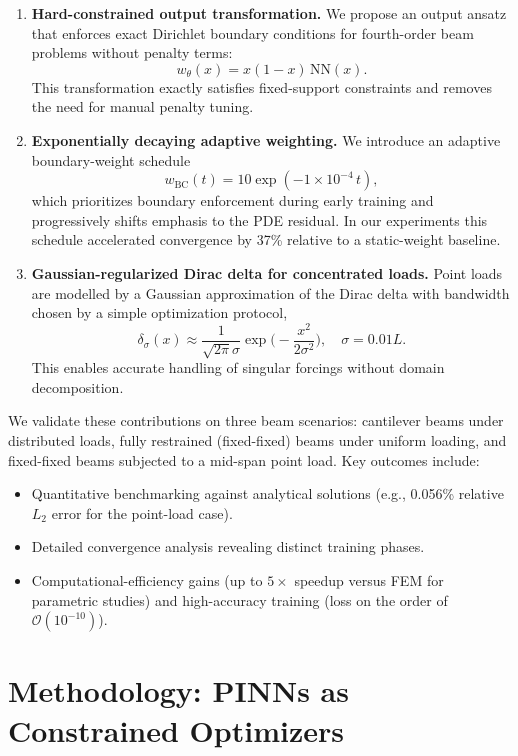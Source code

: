 \documentclass[twocolumn]{svjour3}
\begin{document}
\begin{enumerate}
\item \textbf{Hard-constrained output transformation.} 
  We propose an output ansatz that enforces exact Dirichlet boundary conditions for fourth-order beam problems without penalty terms:
  \[
    w_{\theta}(x) = x(1-x)\,\mathrm{NN}(x).
  \]
  This transformation exactly satisfies fixed-support constraints and removes the need for manual penalty tuning.
  
  \item \textbf{Exponentially decaying adaptive weighting.} 
  We introduce an adaptive boundary-weight schedule
  \[
    w_{\mathrm{BC}}(t)=10\exp(-1\times10^{-4}\,t),
  \]
  which prioritizes boundary enforcement during early training and progressively shifts emphasis to the PDE residual. In our experiments this schedule accelerated convergence by 37\% relative to a static-weight baseline.
  
  \item \textbf{Gaussian-regularized Dirac delta for concentrated loads.} 
  Point loads are modelled by a Gaussian approximation of the Dirac delta with bandwidth chosen by a simple optimization protocol,
  \[
    \delta_{\sigma}(x)\approx\frac{1}{\sqrt{2\pi}\sigma}\exp\!\Big(-\frac{x^{2}}{2\sigma^{2}}\Big),\quad \sigma=0.01L.
  \]
  This enables accurate handling of singular forcings without domain decomposition.
\end{enumerate}

We validate these contributions on three beam scenarios: cantilever beams under distributed loads, fully restrained (fixed-fixed) beams under uniform loading, and fixed-fixed beams subjected to a mid-span point load. Key outcomes include:
\begin{itemize}
  \item Quantitative benchmarking against analytical solutions (e.g., 0.056\% relative \(L_{2}\) error for the point-load case).
  \item Detailed convergence analysis revealing distinct training phases.
  \item Computational-efficiency gains (up to \(5\times\) speedup versus FEM for parametric studies) and high-accuracy training (loss on the order of \(\mathcal{O}(10^{-10})\)).
\end{itemize}



	
	\section{Methodology: PINNs as Constrained Optimizers}\label{sec:method}
	
\end{document}
